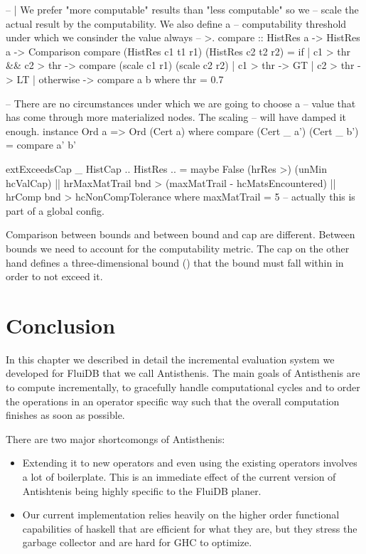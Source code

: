 \begin{code}
\begin{haskellcode}
-- | We prefer "more computable" results than "less computable" so we
-- scale the actual result by the computability. We also define a
-- computability threshold under which we consinder the value always
-- >.
compare :: HistRes a -> HistRes a -> Comparison
compare (HistRes c1 t1 r1) (HistRes c2 t2 r2) =
  if
    | c1 > thr && c2 > thr -> compare (scale c1 r1) (scale c2 r2)
    | c1 > thr             -> GT
    | c2 > thr             -> LT
    | otherwise            -> compare a b
  where
    thr = 0.7

-- There are no circumstances under which we are going to choose a
-- value that has come through more materialized nodes. The scaling
-- will have damped it enough.
instance Ord a => Ord (Cert a) where
  compare (Cert _ a') (Cert _ b') = compare a' b'

extExceedsCap _ HistCap {..} HistRes {..} =
  maybe False (hrRes >) (unMin hcValCap)
  || hrMaxMatTrail bnd > (maxMatTrail - hcMatsEncountered)
  || hrComp bnd > hcNonCompTolerance
  where
    maxMatTrail = 5 -- actually this is part of a global config.
\end{haskellcode}
\caption{\label{lst:hist_compare}Comparison between bounds and
  between bound and cap are different. Between bounds we need to
  account for the computability metric. The cap on the other hand
  defines a three-dimensional bound () that the bound must fall
  within in order to not exceed it.}
\end{code}

\section{Conclusion}

In this chapter we described in detail the incremental evaluation
system we developed for FluiDB that we call Antisthenis. The main
goals of Antisthenis are to compute incrementally, to gracefully
handle computational cycles and to order the operations in an operator
specific way such that the overall computation finishes as soon as
possible.

There are two major shortcomongs of Antisthenis:

\begin{itemize}
\item Extending it to new operators and even using the existing operators
involves a lot of boilerplate. This is an immediate effect of the
current version of Antishtenis being highly specific to the FluiDB
planer.
\item Our current implementation relies heavily on the higher order
functional capabilities of haskell that are efficient for what they
are, but they stress the garbage collector and are hard for GHC to
optimize.
\end{itemize}

